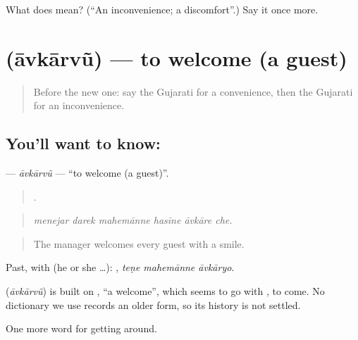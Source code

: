 \begin{tcolorbox}[breakable,colback=teal!4,colframe=teal!35!black,title={Before you move on}]
What does  mean? (\textquotedblleft{}An inconvenience; a discomfort\textquotedblright{}.) Say it once more.
\end{tcolorbox}
\section[\texorpdfstring{\gu{આવકારવું} (āvkārvũ)}{આવકારવું (āvkārvũ)}]{ (āvkārvũ) — to welcome (a guest)}

\label{lesson:GU-C409-avkarvu}



\begin{quote}
Before the new one: say the Gujarati for a convenience, then the Gujarati for an inconvenience.
\end{quote}

\subsection*{You'll want to know: }
\textbf{} — \emph{āvkārvũ} — \textquotedblleft{}to welcome (a guest)\textquotedblright{}.

\begin{quote}
     .
\end{quote}

\begin{quote}
\emph{menejar darek mahemānne hasīne āvkāre che.}
\end{quote}

\begin{quote}
The manager welcomes every guest with a smile.
\end{quote}

Past, with  (he or she …):   , \emph{teṇe mahemānne āvkāryo}.

\begin{cousinweb}
\textbf{} (\emph{āvkārvũ}) is built on , \textquotedblleft{}a welcome\textquotedblright{}, which seems to go with , to come. No dictionary we use records an older form, so its history is not settled.
\end{cousinweb}

\begin{grammarlens}[title={What you've built}]
One more word for getting around.
\end{grammarlens}


